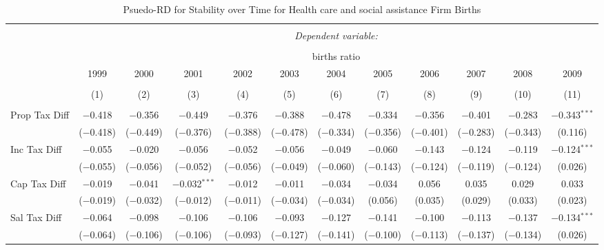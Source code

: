 
\begin{table}[!htbp] \centering 
  \caption{Psuedo-RD for Stability over Time for  Health care and social assistance Firm Births} 
  \label{62year} 
\small 
\begin{tabular}{@{\extracolsep{5pt}}lccccccccccc} 
\\[-1.8ex]\hline 
\hline \\[-1.8ex] 
 & \multicolumn{11}{c}{\textit{Dependent variable:}} \\ 
\cline{2-12} 
\\[-1.8ex] & \multicolumn{11}{c}{births ratio} \\ 
 & 1999 & 2000 & 2001 & 2002 & 2003 & 2004 & 2005 & 2006 & 2007 & 2008 & 2009 \\ 
\\[-1.8ex] & (1) & (2) & (3) & (4) & (5) & (6) & (7) & (8) & (9) & (10) & (11)\\ 
\hline \\[-1.8ex] 
 Prop Tax Diff & $-$0.418 & $-$0.356 & $-$0.449 & $-$0.376 & $-$0.388 & $-$0.478 & $-$0.334 & $-$0.356 & $-$0.401 & $-$0.283 & $-$0.343$^{***}$ \\ 
  & ($-$0.418) & ($-$0.449) & ($-$0.376) & ($-$0.388) & ($-$0.478) & ($-$0.334) & ($-$0.356) & ($-$0.401) & ($-$0.283) & ($-$0.343) & (0.116) \\ 
  Inc Tax Diff & $-$0.055 & $-$0.020 & $-$0.056 & $-$0.052 & $-$0.056 & $-$0.049 & $-$0.060 & $-$0.143 & $-$0.124 & $-$0.119 & $-$0.124$^{***}$ \\ 
  & ($-$0.055) & ($-$0.056) & ($-$0.052) & ($-$0.056) & ($-$0.049) & ($-$0.060) & ($-$0.143) & ($-$0.124) & ($-$0.119) & ($-$0.124) & (0.026) \\ 
  Cap Tax Diff & $-$0.019 & $-$0.041 & $-$0.032$^{***}$ & $-$0.012 & $-$0.011 & $-$0.034 & $-$0.034 & 0.056 & 0.035 & 0.029 & 0.033 \\ 
  & ($-$0.019) & ($-$0.032) & ($-$0.012) & ($-$0.011) & ($-$0.034) & ($-$0.034) & (0.056) & (0.035) & (0.029) & (0.033) & (0.023) \\ 
  Sal Tax Diff & $-$0.064 & $-$0.098 & $-$0.106 & $-$0.106 & $-$0.093 & $-$0.127 & $-$0.141 & $-$0.100 & $-$0.113 & $-$0.137 & $-$0.134$^{***}$ \\ 
  & ($-$0.064) & ($-$0.106) & ($-$0.106) & ($-$0.093) & ($-$0.127) & ($-$0.141) & ($-$0.100) & ($-$0.113) & ($-$0.137) & ($-$0.134) & (0.026) \\ 

\end{tabular}
\end{table}
